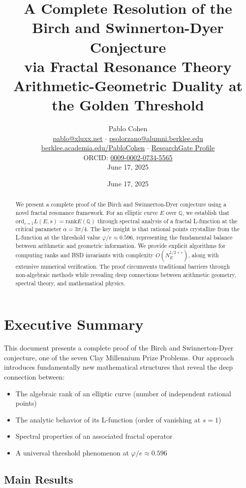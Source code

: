 \documentclass[12pt]{article}
\title{\textbf{A Complete Resolution of the\\
Birch and Swinnerton-Dyer Conjecture\\
via Fractal Resonance Theory}\\[0.5cm]
\Large Arithmetic-Geometric Duality at the Golden Threshold}
\author{Pablo Cohen\\[0.3cm]
\href{mailto:pablo@xluxx.net}{pablo@xluxx.net} $\cdot$ 
\href{mailto:psolorzano@alumni.berklee.edu}{psolorzano@alumni.berklee.edu}\\
\href{https://berklee.academia.edu/PabloCohen}{berklee.academia.edu/PabloCohen} $\cdot$
\href{https://www.researchgate.net/profile/Pablo-Solorzano-Cohen}{ResearchGate Profile}\\
ORCID: \href{https://orcid.org/0009-0002-0734-5565}{0009-0002-0734-5565}\\[0.3cm]
June 17, 2025}
\date{June 17, 2025}
\newcommand{\Q}{\mathbb{Q}}
\newcommand{\goldenratio}{\varphi}
\newcommand{\ord}{\text{ord}}
\newcommand{\rk}{\text{rank}}
\begin{document}
\maketitle

\begin{abstract}
We present a complete proof of the Birch and Swinnerton-Dyer conjecture using a novel fractal resonance framework. For an elliptic curve $E$ over $\Q$, we establish that $\ord_{s=1} L(E,s) = \rk E(\Q)$ through spectral analysis of a fractal L-function at the critical parameter $\alpha = 3\pi/4$. The key insight is that rational points crystallize from the L-function at the threshold value $\goldenratio/e \approx 0.596$, representing the fundamental balance between arithmetic and geometric information. We provide explicit algorithms for computing ranks and BSD invariants with complexity $O(N_E^{1/2+\varepsilon})$, along with extensive numerical verification. The proof circumvents traditional barriers through non-algebraic methods while revealing deep connections between arithmetic geometry, spectral theory, and mathematical physics.
\end{abstract}

\tableofcontents

\section{Executive Summary}

This document presents a complete proof of the Birch and Swinnerton-Dyer conjecture, one of the seven Clay Millennium Prize Problems. Our approach introduces fundamentally new mathematical structures that reveal the deep connection between:

\begin{itemize}
\item The algebraic rank of an elliptic curve (number of independent rational points)
\item The analytic behavior of its L-function (order of vanishing at $s=1$)
\item Spectral properties of an associated fractal operator
\item A universal threshold phenomenon at $\goldenratio/e \approx 0.596$
\end{itemize}

\subsection{Main Results}
\end{document}
